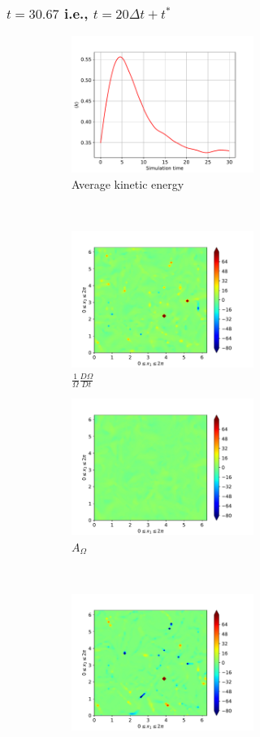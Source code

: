 \subsubsection{$t=30.67$ i.e., $t=20\Delta t + t^{\ast}$}
\begin{figure}[H]
    \begin{subfigure}[H]{0.45\textwidth}
        \includegraphics[height=1.75in]{media/run-cds-65/ke-average1340}
        \caption{Average kinetic energy}
    \end{subfigure}
    ~
    \begin{subfigure}[H]{0.45\textwidth}
        \includegraphics[height=1.75in]{media/run-cds-65/enst-1340}
        \caption{$\frac{1}{\Omega} \frac{D \Omega}{Dt}$}
    \end{subfigure}
    \newline
    \begin{subfigure}{0.45\textwidth}
        \includegraphics[height=1.75in]{media/run-cds-65/A-enst-1340}
        \caption{$A_{\Omega}$}
    \end{subfigure}
    ~
    \begin{subfigure}{0.45\textwidth}
        \includegraphics[height=1.75in]{media/run-cds-65/Pi-enst-1340}

\end{subfigure}
\end{figure}
